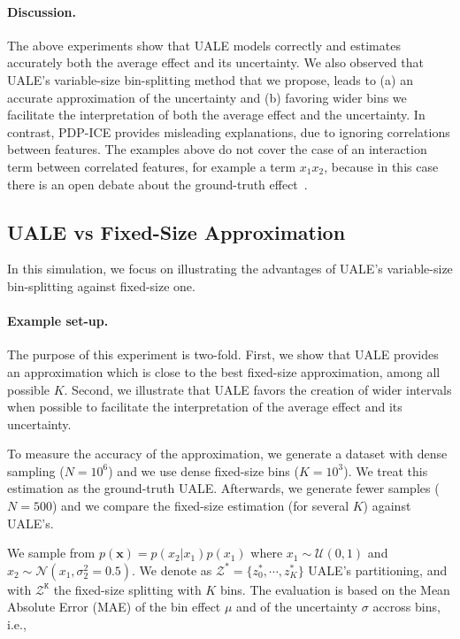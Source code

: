 \documentclass[twoside]{article}
\begin{document}
\paragraph{Discussion.}

The above experiments show that UALE models correctly and estimates
accurately both the average effect and its uncertainty. We also
observed that UALE's variable-size bin-splitting method that we
propose, leads to (a) an accurate approximation of the uncertainty and
(b) favoring wider bins we facilitate the interpretation of both the
average effect and the uncertainty. In contrast, PDP-ICE provides
misleading explanations, due to ignoring correlations between
features. The examples above do not cover the case of an interaction
term between correlated features, for example a term \(x_1x_2\),
because in this case there is an open debate about the ground-truth
effect~\citep{Gromping2020MAEP}.

\subsection{UALE vs Fixed-Size Approximation}
\label{sec:simulation-examples-2}

In this simulation, we focus on illustrating the advantages of UALE's
variable-size bin-splitting against fixed-size one.

\paragraph{Example set-up.}
The purpose of this experiment is two-fold. First, we show that UALE
provides an approximation which is close to the best fixed-size
approximation, among all possible \(K\). Second, we illustrate that
UALE favors the creation of wider intervals when possible to
facilitate the interpretation of the average effect and its
uncertainty.

To measure the accuracy of the approximation, we generate a dataset
with dense sampling (\(N=10^6\)) and we use dense fixed-size bins
(\(K=10^3\)). We treat this estimation as the ground-truth
UALE. Afterwards, we generate fewer samples (\(N=500\)) and we compare
the fixed-size estimation (for several \(K\)) against UALE's.

We sample from \(p(\mathbf{x}) = p(x_2|x_1)p(x_1)\) where
\(x_1 \sim \mathcal{U}(0,1)\) and
\(x_2 \sim \mathcal{N}(x_1, \sigma_2^2=0.5)\). We denote as
\(\mathcal{Z^*} = \{z^*_0, \cdots, z^*_K\}\) UALE's partitioning, and
with \(\mathcal{Z^{\mathtt{K}}}\) the fixed-size splitting with \(K\)
bins. The evaluation is based on the Mean Absolute Error (MAE) of the
bin effect \(\mu\) and of the uncertainty \(\sigma\) accross bins,
i.e.,
\end{document}
